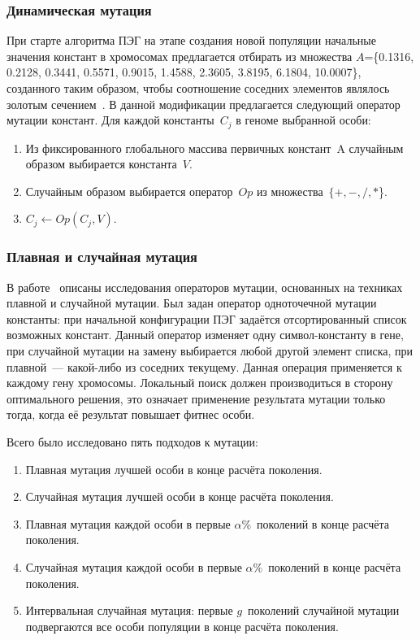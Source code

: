 
\subsubsection{Динамическая мутация}

При старте алгоритма ПЭГ на этапе создания новой популяции начальные значения констант в хромосомах предлагается отбирать из множества $A$=\{0.1316, 0.2128, 0.3441, 0.5571, 0.9015, 1.4588, 2.3605, 3.8195, 6.1804, 10.0007\}, созданного таким образом, чтобы соотношение соседних элементов являлось золотым сечением~\cite{Peng:2007:FFC:1304604.1305824}. В данной модификации предлагается следующий оператор мутации констант. Для каждой константы~$C_j$ в геноме выбранной особи:
\begin{enumerate}
  \item Из фиксированного глобального массива первичных констант~A случайным образом выбирается константа~$V$.
  \item Случайным образом выбирается оператор~$Op$ из множества~$\{+, -, /, *$\}.
  \item $C_j \leftarrow Op(C_j, V)$.
\end{enumerate}


\subsubsection{Плавная и случайная мутация}

В работе~\cite{li:2004:lbp} описаны исследования операторов мутации, основанных на техниках плавной и случайной мутации. Был задан оператор одноточечной мутации константы: при начальной конфигурации ПЭГ задаётся отсортированный список возможных констант. Данный оператор изменяет одну символ-константу в гене, при случайной мутации на замену выбирается любой другой элемент списка, при плавной~--- какой-либо из соседних текущему. Данная операция применяется к каждому гену хромосомы. Локальный поиск должен производиться в сторону оптимального решения, это означает применение результата мутации только тогда, когда её результат повышает фитнес особи.

Всего было исследовано пять подходов к мутации:
\begin{enumerate}
  \item Плавная мутация лучшей особи в конце расчёта поколения.
  \item Случайная мутация лучшей особи в конце расчёта поколения.
  \item Плавная мутация каждой особи в первые $\alpha\%$~поколений в конце расчёта поколения.
  \item Случайная мутация каждой особи в первые $\alpha\%$~поколений в конце расчёта поколения.
  \item Интервальная случайная мутация: первые $g$~поколений случайной мутации подвергаются все особи популяции в конце расчёта поколения.
\end{enumerate}

